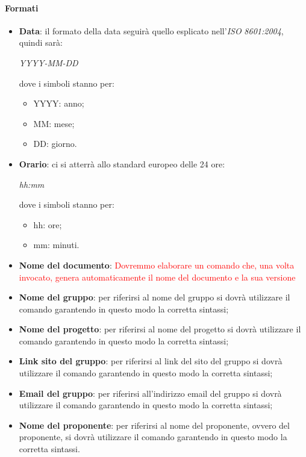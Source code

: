 	\paragraph{Formati}
	\begin{itemize}
		\item \textbf{Data}: il formato della data seguirà quello esplicato nell'\emph{ISO} \emph{8601:2004}, quindi sarà: 
		\begin{center}
			\emph{YYYY-MM-DD}
		\end{center}
		dove i simboli stanno per:
		\begin{itemize}
			\item YYYY: anno;
			\item MM: mese;
			\item DD: giorno.
		\end{itemize}
		\item \textbf{Orario}: ci si atterrà allo standard europeo delle 24 ore:
		 \begin{center}
		 	\emph{hh:mm}
		 \end{center}
	 	dove i simboli stanno per:
	 	\begin{itemize}
	 		\item hh: ore;
	 		\item mm: minuti.
	 	\end{itemize}
		\item \textbf{Nome del documento}: \textcolor{red}{Dovremmo elaborare un comando che, una volta invocato, genera automaticamente il nome del documento e la sua versione}
		\item \textbf{Nome del gruppo}: per riferirsi al nome del gruppo si dovrà
		utilizzare il comando garantendo in questo modo la corretta sintassi;
		\item \textbf{Nome del progetto}: per riferirsi al nome del progetto si dovrà
		utilizzare il comando garantendo in questo modo la corretta sintassi;
		\item \textbf{Link sito del gruppo}: per riferirsi al link del sito del gruppo si dovrà
		utilizzare il comando garantendo in questo modo la corretta sintassi;
		\item \textbf{Email del gruppo}: per riferirsi all'indirizzo email del gruppo si dovrà
		utilizzare il comando garantendo in questo modo la corretta sintassi;
		\item \textbf{Nome del proponente}: per riferirsi al nome del proponente, ovvero del proponente, si dovrà
		utilizzare il comando garantendo in questo modo la corretta
		sintassi.
	\end{itemize}
